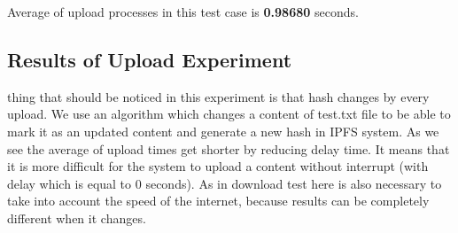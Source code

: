 \documentclass[a4paper,12pt,fleqn]{article}
\begin{document}
Average of upload processes in this test case is \textbf{0.98680} seconds. 

\subsection{Results of Upload Experiment}
 thing that should be noticed in this experiment is that hash changes by every upload. We use an algorithm which changes a content of test.txt file to be able to mark it as an updated content and generate a new hash in IPFS system. As we see the average of upload times get shorter by reducing delay time. It means that it is more difficult for the system to upload a content without interrupt (with delay which is equal to 0 seconds). As in download test here is also necessary to take into account the speed of the internet, because results can be completely different when it changes.




\end{document}
